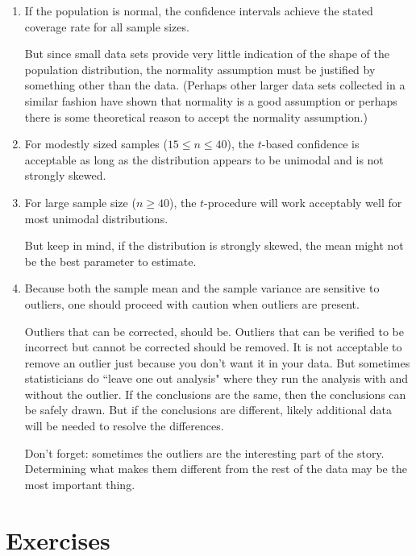 \documentclass[twoside]{book}\usepackage[]{graphicx}\usepackage[]{xcolor}
\begin{document}
\begin{enumerate}
	\item If the population is normal, the confidence intervals achieve
		the stated coverage rate for all sample sizes.

		But since small data sets provide very little indication
		of the shape of the population distribution, the normality assumption
		must be justified by something other than the data.
		(Perhaps other larger data sets collected in a similar fashion 
		have shown that normality is a good assumption or perhaps there
		is some theoretical reason to accept the normality assumption.)

	\item
		For modestly sized samples ($15 \le n \le 40$), the $t$-based 
		confidence is acceptable as long as the distribution appears 
		to be unimodal and is not strongly skewed.

	\item
		For large sample size ($n \ge 40$), the $t$-procedure will work acceptably
		well for most unimodal distributions.

		But keep in mind, if the distribution is strongly skewed, the 
		mean might not be the best parameter to estimate.

	\item
		Because both the sample mean and the sample variance are sensitive
		to outliers, one should proceed with caution when outliers 
		are present.

		Outliers that can be corrected, should be.  Outliers that can be verified
		to be incorrect but cannot be corrected should be removed.  It is not
		acceptable to remove an outlier just because you don't want it in your data.
		But sometimes statisticians do ``leave one out analysis" where they run the 
		analysis with and without the outlier.  If the conclusions are the same, then
		the conclusions can be safely drawn.  But if the conclusions are different,
		likely additional data will be needed to resolve the differences.

		Don't forget: sometimes the outliers are the interesting part of the story.
		Determining what makes them different from the rest of the data may be 
		the most important thing.

\end{enumerate}



\newpage
\section*{Exercises}
\end{document}
